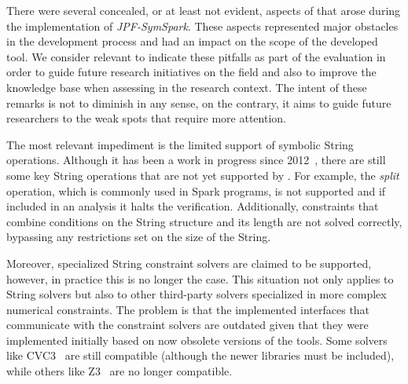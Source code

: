 

%
%
%
%

There were several concealed, or at least not evident, aspects of \spf{} that arose during the implementation of \textit{JPF-SymSpark}. These aspects represented major obstacles in the development process and had an impact on the scope of the developed tool. We consider relevant to indicate these pitfalls as part of the evaluation in order to guide future research initiatives on the field and also to improve the knowledge base when assessing \spf{} in the research context. The intent of these remarks is not to diminish \spf{} in any sense, on the contrary, it aims to guide future researchers to the weak spots that require more attention.

The most relevant impediment is the limited support of symbolic String operations. Although it has been a work in progress since 2012~\cite{Redelinghuys2012,Pasareanu2013}, there are still some key String operations that are not yet supported by \spf{}. For example, the \textit{split} operation, which is commonly used in Spark programs, is not supported and if included in an analysis it halts the verification. Additionally, constraints that combine conditions on the String structure and its length are not solved correctly, bypassing any restrictions set on the size of the String.

Moreover, specialized String constraint solvers are claimed to be supported, however, in practice this is no longer the case. This situation not only applies to String solvers but also to other third-party solvers specialized in more complex numerical constraints. The problem is that the implemented interfaces that communicate with the constraint solvers are outdated given that they were implemented initially based on now obsolete versions of the tools. Some solvers like CVC3~\cite{Barrett2007} are still compatible (although the newer libraries must be included), while others like Z3~\cite{DeMoura2008} are no longer compatible.

